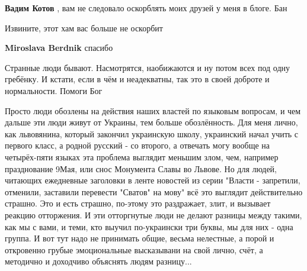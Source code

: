 \begin{itemize}
\begin{itemize}
\textbf{Вадим Котов} , вам не следовало оскорблять моих друзей у меня в блоге. Бан


 
Извините, этот хам вас больше не оскорбит

 
\textbf{Miroslava Berdnik} спасибо
\end{itemize}

 

Странные люди бывают. Насмотрятся, наобижаются и ну потом всех под одну
гребёнку. И кстати, если в чём и неадекватны, так это в своей доброте и
нормальности. Помоги Бог


 

Просто люди обозлены на действия наших властей по языковым вопросам, и чем
дальше эти люди живут от Украины, тем больше обозлённость. Для меня лично, как
львовянина, который закончил украинскую школу, украинский начал учить с первого
класс, а родной русский - со второго, а отвечать могу вообще на четырёх-пяти
языках эта проблема выглядит меньшим злом, чем, например празднование 9Мая, или
снос Монумента Славы во Львове. Но для людей, читающих ежедневные заголовки в
ленте новостей из серии "Власти - запретили, отменили, заставили перевести
"Сватов" на мову" всё это выглядит действительно страшно. Это и есть страшно,
по-этому это раздражает, злит, и вызывает реакцию отторжения. И эти отторгнутые
люди не делают разницы между такими, как мы с вами, и теми, кто выучил
по-украински три буквы, мы для них - одна группа. И вот тут надо не принимать
общие, весьма нелестные, а порой и откровенно грубые эмоциональные высказывани
на свой лично, счёт, а методично и доходчиво объяснять людям разницу...


\end{itemize}
